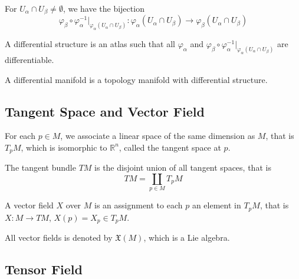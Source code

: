 For $U_\alpha \cap U_\beta \ne \emptyset$, we have the bijection
$$\varphi_\beta \circ \varphi_\alpha^{-1} \vert_{\varphi_\alpha(U_\alpha\cap U_\beta)} :
\varphi_\alpha(U_\alpha \cap U_\beta) \to
\varphi_\beta(U_\alpha \cap U_\beta) $$

A differential structure is an atlas such that all $\varphi_\alpha$
and $\varphi_\beta \circ \varphi_\alpha^{-1} \vert_{\varphi_\alpha(U_\alpha\cap U_\beta)}$
are differentiable.

A differential manifold is a topology manifold with differential structure.

\subsection{Tangent Space and Vector Field}
For each $p \in M$, we associate a linear space of the same dimension as $M$,
that is $T_pM$, which is isomorphic to $\mathbb R^n$, called the tangent space at $p$.

The tangent bundle $TM$ is the disjoint union of all tangent spaces,
that is $$TM = \coprod_{p \in M} T_pM$$

A vector field $X$ over $M$ is an assignment to each $p$ an element in $T_pM$,
that is $X : M \to TM$, $X(p) = X_p \in T_pM$.

All vector fields is denoted by $\mathfrak X(M)$, which is a Lie algebra.

\subsection{Tensor Field}
